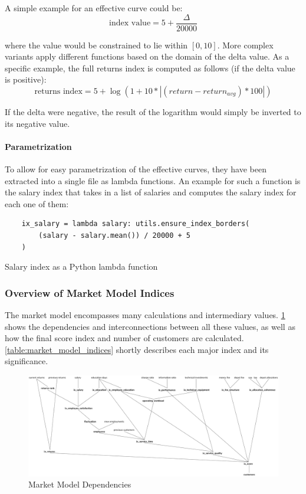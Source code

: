 A simple example for an effective curve could be:
\[\text{index value} = 5 + \frac{\Delta}{20000}\]

where the value would be constrained to lie within \([0, 10]\). More complex variants apply different functions based on the domain of the delta value. As a specific example, the full returns index is computed as follows (if the delta value is positive):
\[\text{returns index} = 5 + \log(1 + 10 * |(return - return_{avg}) * 100|)\]

If the delta were negative, the result of the logarithm would simply be inverted to its negative value.

\paragraph{Parametrization}
To allow for easy parametrization of the effective curves, they have been extracted into a single file as lambda functions. An example for such a function is the salary index that takes in a list of salaries and computes the salary index for each one of them:

\begin{listing}[h!]
    \begin{verbatim}
    ix_salary = lambda salary: utils.ensure_index_borders(
        (salary - salary.mean()) / 20000 + 5
    )
    \end{verbatim}
    \caption{Salary index as a Python lambda function}
    \label{lst:salary_lambda}
\end{listing}

\subsubsection{Overview of Market Model Indices}
The market model encompasses many calculations and intermediary values. \cref{fig:market_model_dependencies} shows the dependencies and interconnections between all these values, as well as how the final score index and number of customers are calculated. \cref{table:market_model_indices} shortly describes each major index and its significance.

\begin{figure}[h!]
  \includegraphics[width=\textwidth]{img/market_model_dependencies.png}
  \caption{Market Model Dependencies}
  \centering
  \label{fig:market_model_dependencies}
\end{figure}

